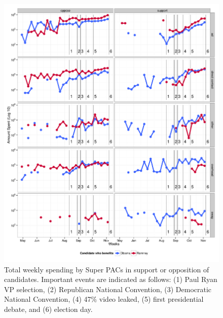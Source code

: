 \documentclass[11pt]{article}\usepackage{graphicx, color}
\newenvironment{knitrout}{}{} %
\begin{document}
\begin{knitrout}
\color{fgcolor}\begin{figure}[H]


{\centering \includegraphics[width=\textwidth]{figure/temporal_plot} 

}

\caption[Total weekly spending by Super PACs in support or opposition of candidates]{Total weekly spending by Super PACs in support or opposition of candidates. Important events are indicated as follows: (1) Paul Ryan VP selection, (2) Republican National Convention, (3) Democratic National Convention, (4) 47\% video leaked, (5) first presidential debate, and (6) election day.\label{fig:temporal_plot}}
\end{figure}


\end{knitrout}
\end{document}
